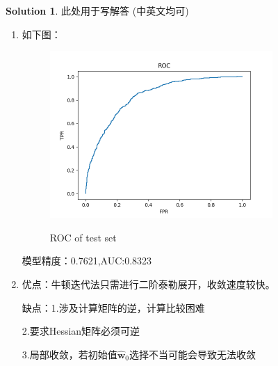 \documentclass[a4paper,UTF8]{article}
\numberwithin{equation}{section}
\theoremstyle{definition}
\newtheorem*{solution}{Solution}
\def \w {\hat{\boldsymbol{w}}}
\begin{document}
	\begin{solution}
		此处用于写解答 (中英文均可)
		~\\
		\begin{enumerate}
			\item[(1)]如下图：
		
		\begin{figure}[H]
			\centering
			\includegraphics[width=0.8\textwidth]{Figure_1.png}\\
			\caption{ROC of test set}
			\label{fig:roc}
			\end{figure}
			
		模型精度：0.7621,AUC:0.8323
		\item[(2)]
		优点：牛顿迭代法只需进行二阶泰勒展开，收敛速度较快。

		缺点：1.涉及计算矩阵的逆，计算比较困难

		2.要求Hessian矩阵必须可逆

		3.局部收敛，若初始值$\w_0$选择不当可能会导致无法收敛
		\end{enumerate}
		~\\
		~\\
		~\\
	\end{solution}
	
	
	
\end{document}

